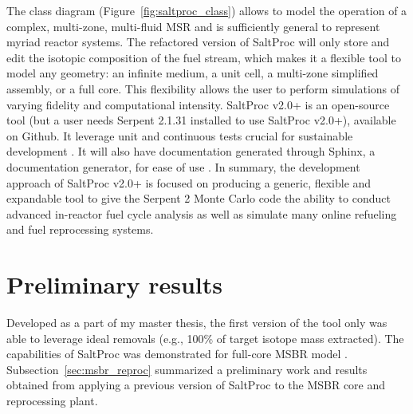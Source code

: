 The class diagram (Figure~\ref{fig:saltproc_class}) allows to model the 
operation of a complex, multi-zone, multi-fluid \gls{MSR} and is sufficiently 
general to represent myriad reactor systems. The refactored version of 
SaltProc will only store and edit the isotopic composition of the fuel stream, 
which makes it a flexible tool to model any geometry: an infinite medium, a 
unit cell, a multi-zone simplified assembly, or a full core. This flexibility 
allows the user to perform simulations of varying fidelity and computational 
intensity. SaltProc v2.0+ is an open-source tool (but a user needs Serpent 
2.1.31 installed to use SaltProc v2.0+), available on Github. It leverage unit 
and continuous tests  crucial for sustainable development  
\cite{krekel_pytest_2004}. It will also have documentation generated through 
Sphinx, a documentation generator, for ease of use \cite{brandl_sphinx_2009}. 
In summary, the development approach of SaltProc v2.0+ is focused on producing 
a generic, flexible and expandable tool to give the Serpent 2 Monte Carlo code 
the ability to conduct advanced in-reactor fuel cycle analysis as well as 
simulate many online refueling and fuel reprocessing systems.


\section{Preliminary results}
Developed as a part of my master thesis, the first version of the tool only 
was able to leverage ideal removals (e.g., 100\% of target isotope mass 
extracted). The capabilities of SaltProc was demonstrated for full-core 
\gls{MSBR} model \cite{rykhlevskii_modeling_2019}. 
Subsection~\ref{sec:msbr_reproc} summarized a preliminary work and results 
obtained from applying a previous version of SaltProc to the \gls{MSBR} core 
and reprocessing plant.

